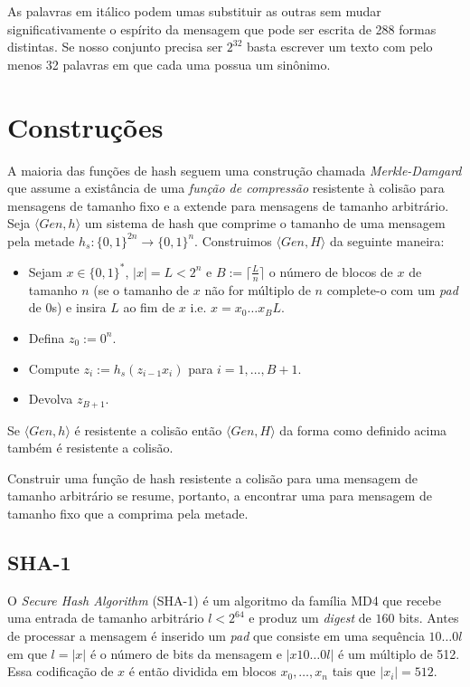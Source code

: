 
As palavras em itálico podem umas substituir as outras sem mudar significativamente o espírito da mensagem que pode ser escrita de 288 formas distintas.
Se nosso conjunto precisa ser $2^{32}$ basta escrever um texto com pelo menos 32 palavras em que cada uma possua um sinônimo.
 
\section{Construções}
\label{sec:construcoes}

A maioria das funções de hash seguem uma construção chamada {\em Merkle-Damgard} que assume a existância de uma {\em função de compressão} resistente à colisão para mensagens de tamanho fixo e a extende para mensagens de tamanho arbitrário.
Seja $\langle Gen, h \rangle$ um sistema de hash que comprime o tamanho de uma mensagem pela metade $h_s:\{0,1\}^{2n} \to \{0,1\}^n$.
Construimos $\langle Gen, H \rangle$ da seguinte maneira:
\begin{itemize}
\item Sejam $x \in \{0,1\}^*$, $|x| = L < 2^n$ e $B := \lceil \frac{L}{n} \rceil$ o número de blocos de $x$ de tamanho $n$ (se o tamanho de $x$ não for múltiplo de $n$ complete-o com um {\em pad} de $0$s) e insira $L$ ao fim de $x$ i.e. $x = x_0 \dots x_B L$.
\item Defina $z_0 := 0^n$.
\item Compute $z_i := h_s(z_{i-1}x_i)$ para $i = 1, \dots, B + 1$.
\item Devolva $z_{B+1}$.
\end{itemize}


\begin{theorem}
  Se $\langle Gen, h \rangle$ é resistente a colisão então $\langle Gen, H \rangle$ da forma como definido acima também é resistente a colisão.
\end{theorem}

Construir uma função de hash resistente a colisão para uma mensagem de tamanho arbitrário se resume, portanto, a encontrar uma para mensagem de tamanho fixo que a comprima pela metade.

\subsection{SHA-1}
\label{sec:sha-1}

O {\em Secure Hash Algorithm} (SHA-1) é um algoritmo da família MD4 que recebe uma entrada de tamanho arbitrário $l < 2^{64}$ e produz um {\em digest} de $160$ bits.
Antes de processar a mensagem é inserido um {\em pad} que consiste em uma sequência $10 \dots 0l$ em que $l = |x|$ é o número de bits da mensagem e $|x10 \dots 0l|$ é um múltiplo de 512.
Essa codificação de $x$ é então dividida em blocos $x_0, \dots, x_n$ tais que $|x_i| = 512$.

